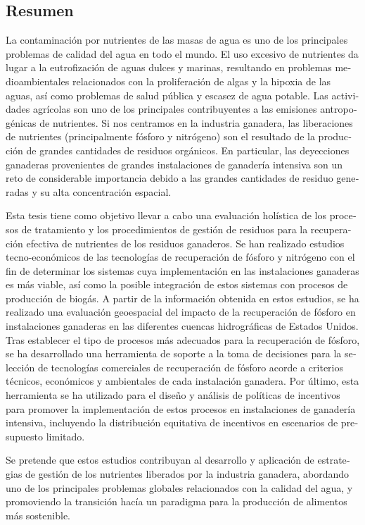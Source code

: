\begin{otherlanguage}{spanish}
\chapter*{Resumen}
La contaminación por nutrientes de las masas de agua es uno de los principales problemas de calidad del agua en todo el mundo. El uso excesivo de nutrientes da lugar a la eutrofización de aguas dulces y marinas, resultando en problemas medioambientales relacionados con la proliferación de algas y la hipoxia de las aguas, así como problemas de salud pública y escasez de agua potable.
Las actividades agrícolas son uno de los principales contribuyentes a las emisiones antropogénicas de nutrientes. Si nos centramos en la industria ganadera, las liberaciones de nutrientes (principalmente fósforo y nitrógeno) son el resultado de la producción de grandes cantidades de residuos orgánicos. En particular, las deyecciones ganaderas provenientes de grandes instalaciones de ganadería intensiva son un reto de considerable importancia debido a las grandes cantidades de residuo generadas y su alta concentración espacial. 

Esta tesis tiene como objetivo llevar a cabo una evaluación holística de los procesos de tratamiento y los procedimientos de gestión de residuos para la recuperación efectiva de nutrientes de los residuos ganaderos. Se han realizado estudios tecno-económicos de las tecnologías de recuperación de fósforo y nitrógeno con el fin de determinar los sistemas cuya implementación en las instalaciones ganaderas es más viable, así como la posible integración de estos sistemas con procesos de producción de biogás. A partir de la información obtenida en estos estudios, se ha realizado una evaluación geoespacial del impacto de la recuperación de fósforo 
en instalaciones ganaderas en las diferentes cuencas hidrográficas de Estados Unidos. Tras establecer el tipo de procesos más adecuados para la recuperación de fósforo, se ha desarrollado una herramienta de soporte a la toma de decisiones para la selección de tecnologías comerciales de recuperación de fósforo acorde a criterios técnicos, económicos y ambientales de cada instalación ganadera. Por último, esta herramienta se ha utilizado para el diseño y análisis de políticas de incentivos para promover la implementación de estos procesos
en instalaciones de ganadería intensiva, incluyendo la distribución equitativa de incentivos en escenarios de presupuesto limitado.

Se pretende que estos estudios contribuyan al desarrollo y aplicación de estrategias de gestión de los nutrientes liberados por la industria ganadera, abordando uno de los principales problemas globales relacionados con la calidad del agua, y promoviendo la transición hacía un paradigma para la producción de alimentos más sostenible.
\end{otherlanguage}


\vfill
